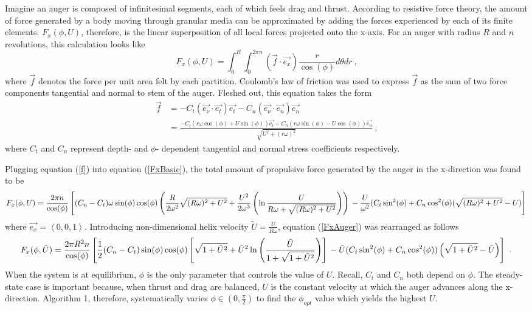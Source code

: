 \documentclass[letterpaper, 11 pt]{article}
\begin{document}
Imagine an auger is composed of infinitesimal segments, each of which feels drag and thrust. According to resistive force theory, the amount of force generated by a body moving through granular media can be approximated by adding the forces experienced by each of its finite elements. $F_x(\phi,U)$, therefore, is the linear superposition of all local forces projected onto the x-axis. For an auger with radius $R$ and $n$ revolutions, this calculation looks like
\begin{equation}\label{FxBasic}
F_x(\phi,U) = \int_{0}^{R}\int_{0}^{2\pi n} (\vec{f}\cdot\vec{e_x})\frac{r}{\cos(\phi)} d\theta dr\ \text{,}
\end{equation}
where $\vec{f}$ denotes the force per unit area felt by each partition. Coulomb's law of friction was used to express $\vec{f}$ as the sum of two force components tangential and normal to stem of the auger. Fleshed out, this equation takes the form
\begin{equation}\label{f}
\begin{split} 
\vec{f} &= -C_t(\vec{e_\nu}\cdot\vec{e_t})\vec{e_t}-C_n(\vec{e_\nu}\cdot\vec
{e_n})\vec{e_n} \\
&=\frac{-C_t(r\omega\cos(\phi)+U\sin(\phi))\vec{e_t}-C_n(r\omega\sin(\phi)-U\cos(\phi))\vec{e_n}}{\sqrt{U^2+(r\omega)^2}}\ \text{,}
\end{split} 
\end{equation}
where $C_t$ and $C_n$ represent depth- and $\phi$- dependent tangential and normal stress coefficients respectively. 

Plugging equation (\ref{f}) into equation (\ref{FxBasic}), the total amount of propulsive force generated by the auger in the x-direction was found to be  
\begin{dmath}\label{FxAuger}
F_x(\phi,U) = \frac{2\pi n}{\cos(\phi)}\left[(C_n-C_t)\omega\sin(\phi)\cos(\phi)\left( \frac{R}{2\omega^2}\sqrt{(R\omega)^2+U^2}+\frac{U^2}{2\omega^3}\left( \ln\frac{U}{R\omega+\sqrt{(R\omega)^2+U^2}}\right) \right) \\
- \frac{U}{\omega^2}(C_t\sin^2(\phi)+C_n\cos^2(\phi)(\sqrt{(R\omega)^2+U^2}-U) \right] 
\end{dmath}
where $\vec{e_x} = \left\langle 0,0,1 \right\rangle $. Introducing non-dimensional helix velocity $\tilde{U} = \frac{U}{R\omega}$, equation (\ref{FxAuger}) was rearranged as follows
\begin{dmath}\label{NDFxAuger}
F_x(\phi, \tilde{U}) = \frac{2\pi R^2n}{\cos(\phi)}\left[\frac{1}{2}(C_n-C_t)\sin(\phi)\cos(\phi)\left[\sqrt{1+\tilde{U}^2}+\tilde{U}^2\ln\left(\frac{\tilde{U}}{1+\sqrt{1+\tilde{U}^2}} \right)  \right] \\
- \tilde{U}(C_t\sin^2(\phi)+C_n\cos^2(\phi))\left(\sqrt{1+\tilde{U}^2}-\tilde{U}\right) \right]\ \text{.} 
\end{dmath}
When the system is at equilibrium, $\phi$ is the only parameter that controls the value of $U$. Recall, $C_t$ and $C_n$ both depend on $\phi$. The steady-state case is important because, when thrust and drag are balanced, $U$ is the constant velocity at which the auger advances along the x-direction. Algorithm 1, therefore, systematically varies $\phi\in\left(0,\frac{\pi}{2} \right) $ to find the $\phi_{opt}$ value which yields the highest $U$.  
\end{document}
